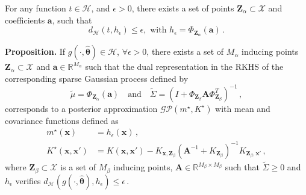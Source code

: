 \documentclass[aspectratio=149]{beamer}
\begin{document}
    \begin{frame}

        For any function \(t \in \mathcal{H}\), and \(\epsilon > 0\), there exists a set of points \(\mathbf{Z}_\alpha \subset \mathcal{X}\) and coefficients \(\bm{a}\), such that
        \[
            d_{\mathcal{H}}(t, h_\epsilon) \leq \epsilon, \text{ with } h_\epsilon = \Phi_{\mathbf{Z}_\alpha}(\bm{a})\,.
        \]


    \end{frame}

    \begin{frame}
        \textbf{Proposition.} If \(g(\cdot, \hat{\bm{\theta}}) \in \mathcal{H}\), \(\forall \epsilon > 0\), there exists a set of \(M_\alpha\) inducing points \(\mathbf{Z}_{\alpha} \subset \mathcal{X}\) and \(\bm{a} \in \mathbb{R}^{M_\alpha}\) such that the dual representation in the RKHS of the corresponding sparse Gaussian process defined by
        \[
            \tilde{\mu} = \Phi_{\mathbf{Z}_{\alpha}}(\bm{a}) \quad \text{and} \quad \tilde{\Sigma} = (I + \Phi_{\mathbf{Z}_{\beta}}\bm{A}\Phi_{\mathbf{Z}_{\beta}}^T)^{-1}\,,
        \]
        corresponds to a posterior approximation \(\mathcal{GP}(m^\star, K^\star)\) with mean and covariance functions defined as
        \[
            \begin{aligned}
                m^{\star}(\mathbf{x}) &= h_\epsilon(\mathbf{x})\,, \\
                K^{\star}(\mathbf{x}, \mathbf{x}') &=K(\mathbf{x}, \mathbf{x}') -  K_{\mathbf{x}, \mathbf{Z}_\beta}(\bm{A}^{-1} + K_{\mathbf{Z}_\beta})^{-1} K_{\mathbf{Z}_\beta, \mathbf{x}'}\,,
            \end{aligned}
        \]
        where \(\mathbf{Z}_{\beta} \subset \mathcal{X} \) is a set of \(M_\beta\) inducing points, \(\bm{A} \in \mathbb{R}^{M_\beta \times M_\beta}\) such that \(\tilde{\Sigma} \geq 0\) and \(h_\epsilon\) verifies \( d_{\mathcal{H}}(g(\cdot, \hat{\bm{\theta}}), h_\epsilon) \leq \epsilon\,\).
    \end{frame}
\end{document}
